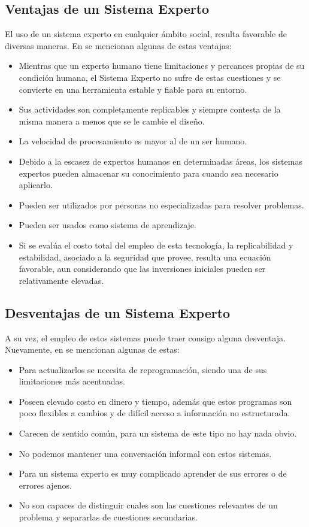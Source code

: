 \subsection{Ventajas de un Sistema Experto}
El uso de un sistema experto en cualquier ámbito social, resulta favorable de diversas maneras. En \cite{KandulaNeha2020} se mencionan algunas de estas ventajas:

\begin{itemize}
\item Mientras que un experto humano tiene limitaciones y percances propias de su condición humana, el Sistema Experto no sufre de estas cuestiones y se convierte en una herramienta estable y fiable para su entorno.
\item Sus actividades son completamente replicables y siempre contesta de la misma manera a menos que se le cambie el diseño.
\item La velocidad de procesamiento es mayor al de un ser humano.
\item Debido a la escasez de expertos humanos en determinadas áreas, los sistemas expertos pueden almacenar su conocimiento para cuando sea necesario aplicarlo.
\item Pueden ser utilizados por personas no especializadas para resolver problemas.
\item Pueden ser usados como sistema de aprendizaje.
\item Si se evalúa el costo total del empleo de esta tecnología, la replicabilidad y estabilidad, asociado a la seguridad que provee, resulta una ecuación favorable, aun considerando que las inversiones iniciales pueden ser
relativamente elevadas.
\end{itemize}

\subsection{Desventajas de un Sistema Experto}
A su vez, el empleo de estos sistemas puede traer consigo alguna desventaja. Nuevamente, en \cite{KandulaNeha2020} se mencionan algunas de estas:

\begin{itemize}
\item Para actualizarlos se necesita de reprogramación, siendo una de sus limitaciones más acentuadas.
\item Poseen elevado costo en dinero y tiempo, además que estos programas son poco flexibles a cambios y de difícil acceso a información no estructurada.
\item Carecen de sentido común, para un sistema de este tipo no hay nada obvio.
\item No podemos mantener una conversación informal con estos sistemas.
\item Para un sistema experto es muy complicado aprender de sus errores o de errores ajenos.
\item No son capaces de distinguir cuales son las cuestiones relevantes de un
problema y separarlas de cuestiones secundarias.
\end{itemize}

